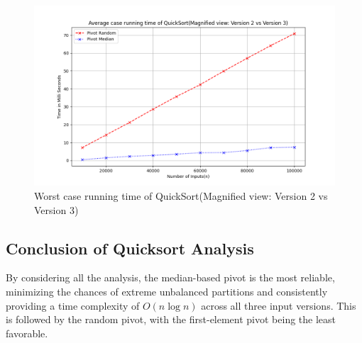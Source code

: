 \documentclass[a4paper,12pt]{report}
\begin{document}
\begin{figure}[H]
	\centering
	\includegraphics[width=1.1\textwidth]{./Average_case_QuickSort_Magnified_view.png}
	\caption{Worst case running time of QuickSort(Magnified view: Version 2 vs Version 3)}
	\label{fig:Average case quicksort Magnified}
\end{figure}

\subsection{Conclusion of Quicksort Analysis}
 By considering all the analysis, the median-based pivot is the most reliable, minimizing the chances of extreme unbalanced partitions and consistently providing a time complexity of \(O(n \log n)\) across all three input versions. This is followed by the random pivot, with the first-element pivot being the least favorable.
 
\end{document}
